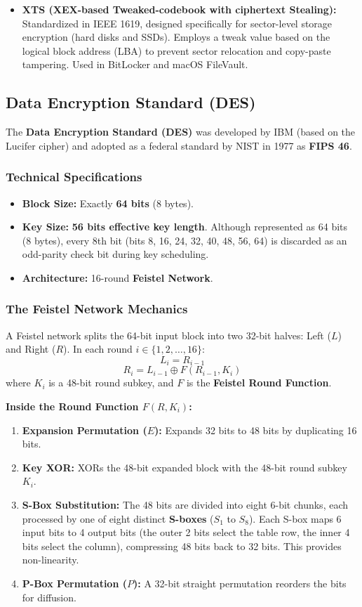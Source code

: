 \begin{itemize}
\item \textbf{XTS (XEX-based Tweaked-codebook with ciphertext Stealing):}
Standardized in IEEE 1619, designed specifically for sector-level storage encryption (hard disks and SSDs). Employs a tweak value based on the logical block address (LBA) to prevent sector relocation and copy-paste tampering. Used in BitLocker and macOS FileVault.
\end{itemize}

\subsection{Data Encryption Standard (DES)}

The \textbf{Data Encryption Standard (DES)} was developed by IBM (based on the Lucifer cipher) and adopted as a federal standard by NIST in 1977 as \textbf{FIPS 46}.

\subsubsection{Technical Specifications}

\begin{itemize}
\item \textbf{Block Size:} Exactly \textbf{64 bits} (8 bytes).
\item \textbf{Key Size:} \textbf{56 bits effective key length}. Although represented as 64 bits (8 bytes), every 8th bit (bits 8, 16, 24, 32, 40, 48, 56, 64) is discarded as an odd-parity check bit during key scheduling.
\item \textbf{Architecture:} 16-round \textbf{Feistel Network}.
\end{itemize}

\subsubsection{The Feistel Network Mechanics}

A Feistel network splits the 64-bit input block into two 32-bit halves: Left ($L$) and Right ($R$). In each round $i \in \{1, 2, \dots, 16\}$:
\[ L_i = R_{i-1} \]
\[ R_i = L_{i-1} \oplus F(R_{i-1}, K_i) \]
where $K_i$ is a 48-bit round subkey, and $F$ is the \textbf{Feistel Round Function}.

\textbf{Inside the Round Function $F(R, K_i)$:}
\begin{enumerate}
\item \textbf{Expansion Permutation ($E$):} Expands 32 bits to 48 bits by duplicating 16 bits.
\item \textbf{Key XOR:} XORs the 48-bit expanded block with the 48-bit round subkey $K_i$.
\item \textbf{S-Box Substitution:} The 48 bits are divided into eight 6-bit chunks, each processed by one of eight distinct \textbf{S-boxes} ($S_1$ to $S_8$). Each S-box maps 6 input bits to 4 output bits (the outer 2 bits select the table row, the inner 4 bits select the column), compressing 48 bits back to 32 bits. This provides non-linearity.
\item \textbf{P-Box Permutation ($P$):} A 32-bit straight permutation reorders the bits for diffusion.
\end{enumerate}

